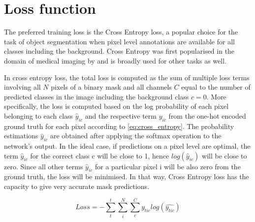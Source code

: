 \section{Loss function}
The preferred training loss is the Cross Entropy loss, a popular choice for the task of object segmentation when pixel level annotations are available for all classes including the background. Cross Entropy was first popularised in the domain of medical imaging by \cite{unet} and is broadly used for other tasks as well. 
\par
In cross entropy loss, the total loss is computed as the sum of multiple loss terms involving all $N$ pixels of a binary mask and all channels $C$ equal to the number of predicted classes in the image including the background class $c=0$. More specifically, the loss is computed based on the log probability of each pixel belonging to each class $\hat{y}_{ic}$ and the respective term $y_{ic}$ from the one-hot encoded ground truth for each pixel according to \eqref{eq:cross_entropy}. The probability estimations $\hat{y}_{ic}$ are obtained after applying the softmax operation to the network's output. In the ideal case, if predictions on a pixel level are optimal, the term $\hat{y}_{ic}$ for the correct class c will be close to 1, hence $log(\hat{y}_{ic})$ will be close to zero. Since all other terms $\hat{y}_{ic}$ for a particular pixel i will be also zero from the ground truth, the loss will be minimised. In that way, Cross Entropy loss has the capacity to give very accurate mask predictions.

\begin{equation}
    Loss = - \sum_t^{t}\sum_i^{N}\sum_c^{C}y_{tic}log(\hat{y_{tic}})
\label{eq:cross_entropy}
\end{equation}

